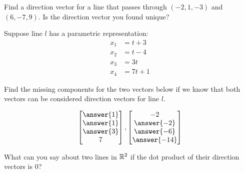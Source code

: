 \documentclass{ximera}
\begin{document}
\begin{problem}\label{prob:directionvect} Find a direction vector for a line that passes through $(-2, 1, -3)$ and $(6, -7, 9)$.  Is the direction vector you found unique?
\end{problem}

\begin{problem}\label{prob:directionvect2}
Suppose line $l$ has a parametric representation:
\begin{align*}
x_1&=t+3\\
x_2&=t-4\\
x_3&=3t\\
x_4&=7t+1
\end{align*}

Find the missing components for the two vectors below if we know that both vectors can be considered  direction vectors for line $l$.

$$\begin{bmatrix}\answer{1}\\\answer{1}\\\answer{3}\\7\end{bmatrix},\begin{bmatrix}-2\\\answer{-2}\\\answer{-6}\\\answer{-14}\end{bmatrix}$$
\end{problem}

\begin{problem}\label{prob:dotproductdirvect}
What can you say about two lines in $\mathbb{R}^2$ if the dot product of their direction vectors is $0$?
\end{problem}
\end{document}

